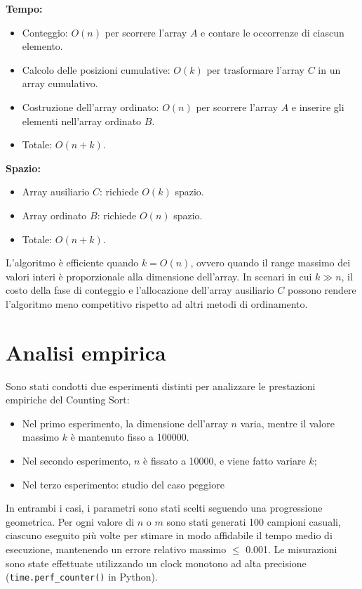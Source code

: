 \documentclass[a4paper, 12pt, oneside]{book}
\begin{document}
\noindent \textbf{Tempo:}

\begin{itemize}
    \item Conteggio: \(O(n)\) per scorrere l'array \(A\) e contare le occorrenze di ciascun elemento.
    \item Calcolo delle posizioni cumulative: \(O(k)\) per trasformare l'array \(C\) in un array cumulativo.
    \item Costruzione dell'array ordinato: \(O(n)\) per scorrere l'array \(A\) e inserire gli elementi nell'array ordinato \(B\).
    \item Totale: \(O(n + k)\).
\end{itemize}

\noindent \textbf{Spazio:}

\begin{itemize}
    \item Array ausiliario \(C\): richiede \(O(k)\) spazio.
    \item Array ordinato \(B\): richiede \(O(n)\) spazio.
    \item Totale: \(O(n + k)\).
\end{itemize}

\noindent L'algoritmo è efficiente quando \(k = O(n)\), ovvero quando il range massimo dei valori interi è proporzionale alla dimensione dell'array.
In scenari in cui \(k \gg n\), il costo della fase di conteggio e l'allocazione dell'array ausiliario \(C\) possono rendere l'algoritmo meno competitivo rispetto ad altri metodi di ordinamento.


\section{Analisi empirica}

Sono stati condotti due esperimenti distinti per analizzare le prestazioni empiriche del Counting Sort:

\begin{itemize}
    \item Nel primo esperimento, la dimensione dell'array \(n\) varia, mentre il valore massimo \(k\) è mantenuto fisso a 100000.
    \item Nel secondo esperimento, \(n\) è fissato a 10000, e viene fatto variare \(k\);
    \item Nel terzo esperimento: studio del caso peggiore 
\end{itemize}

\noindent In entrambi i casi, i parametri sono stati scelti seguendo una progressione geometrica.
Per ogni valore di \(n\) o \(m\) sono stati generati 100 campioni casuali, ciascuno eseguito più volte per stimare in modo affidabile il tempo medio di esecuzione, mantenendo un errore relativo massimo \(\leq\) 0.001.
Le misurazioni sono state effettuate utilizzando un clock monotono ad alta precisione (\texttt{time.perf\_counter()} in Python). \\
\end{document}
